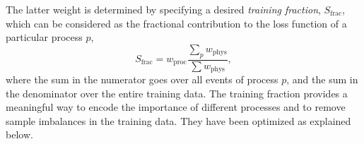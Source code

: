 The latter weight is determined by specifying a desired \emph{training fraction}, $S_\text{frac}$, which can be considered as the fractional contribution to the loss function of a particular process $p$,
\begin{equation}
    S_\text{frac} = w_\text{proc} \frac{\sum_{p} w_\text{phys}}{ \sum w_\text{phys}},
\end{equation}
where the sum in the numerator goes over all events of process $p$, and the sum in the denominator over the entire training data. The training fraction provides a meaningful way to encode the importance of different processes and to remove sample imbalances in the training data. They have been optimized as explained below.

